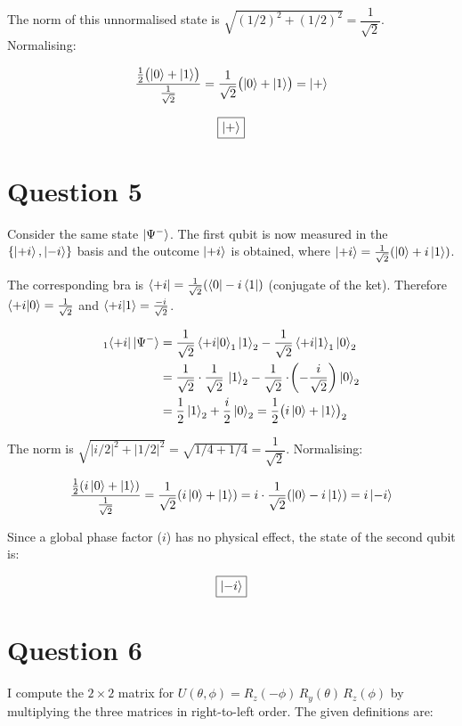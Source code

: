 \documentclass[12pt,a4paper]{article}
\begin{document}
The norm of this unnormalised state is
$\sqrt{(1/2)^2+(1/2)^2}=\dfrac{1}{\sqrt{2}}$.
Normalising:

\[
  \frac{\tfrac{1}{2}\bigl(\ket{0}+\ket{1}\bigr)}{\tfrac{1}{\sqrt{2}}}
  = \frac{1}{\sqrt{2}}\bigl(\ket{0}+\ket{1}\bigr)
  = \ket{+}
\]

\[
  \boxed{\ket{+}}
\]

\section*{Question 5}

Consider the same state $\ket{\Psi^-}$. The first qubit is now measured in the
$\{\ket{+i},\ket{-i}\}$ basis and the outcome $\ket{+i}$ is obtained, where
$\ket{+i}=\tfrac{1}{\sqrt{2}}(\ket{0}+i\ket{1})$.

\medskip
The corresponding bra is $\bra{+i}=\tfrac{1}{\sqrt{2}}(\bra{0}-i\bra{1})$
(conjugate of the ket). Therefore
$\braket{+i|0}=\tfrac{1}{\sqrt{2}}$ and $\braket{+i|1}=\tfrac{-i}{\sqrt{2}}$.

\begin{align*}
{}_{1}\!\bra{+i}\ket{\Psi^-}
  &= \frac{1}{\sqrt{2}}\braket{+i|0}_1\ket{1}_2
   - \frac{1}{\sqrt{2}}\braket{+i|1}_1\ket{0}_2 \\
  &= \frac{1}{\sqrt{2}}\cdot\frac{1}{\sqrt{2}}\,\ket{1}_2
   - \frac{1}{\sqrt{2}}\cdot\!\left(-\frac{i}{\sqrt{2}}\right)\ket{0}_2 \\
  &= \frac{1}{2}\ket{1}_2 + \frac{i}{2}\ket{0}_2
   = \frac{1}{2}\bigl(i\ket{0}+\ket{1}\bigr)_2
\end{align*}

The norm is $\sqrt{|i/2|^2+|1/2|^2}=\sqrt{1/4+1/4}=\dfrac{1}{\sqrt{2}}$.
Normalising:

\[
  \frac{\tfrac{1}{2}(i\ket{0}+\ket{1})}{\tfrac{1}{\sqrt{2}}}
  = \frac{1}{\sqrt{2}}(i\ket{0}+\ket{1})
  = i\cdot\frac{1}{\sqrt{2}}(\ket{0}-i\ket{1})
  = i\ket{-i}
\]

Since a global phase factor ($i$) has no physical effect, the state of the second qubit is:

\[
  \boxed{\ket{-i}}
\]

\section*{Question 6}

I compute the $2\times2$ matrix for
$U(\theta,\phi)=R_z(-\phi)\,R_y(\theta)\,R_z(\phi)$ by multiplying the three matrices
in right-to-left order. The given definitions are:
\end{document}
